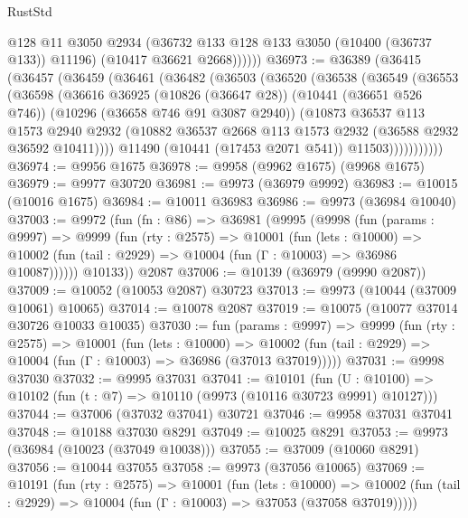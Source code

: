 \begin{lexlean}{RustStd}
\begin{coremodule}
              @128
              @11
              @3050
              @2934
              (@36732 @133 @128 @133 @3050 (@10400 (@36737 @133)) @11196)
              (@10417 @36621 @2668))))))
@36973 := @36389
    (@36415
      (@36457
        (@36459
          (@36461
            (@36482
              (@36503
                (@36520
                  (@36538
                    (@36549
                      (@36553
                        (@36598
                          (@36616
                            @36925
                            (@10826 (@36647 @28))
                            (@10441 (@36651 @526 @746))
                            (@10296 (@36658 @746 @91 @3087 @2940))
                            (@10873
                              @36537
                              @113
                              @1573
                              @2940
                              @2932
                              (@10882 @36537 @2668 @113 @1573 @2932 (@36588 @2932 @36592 @10411))))
                          @11490
                          (@10441 (@17453 @2071 @541))
                          @11503)))))))))))
@36974 := @9956 @1675
@36978 := @9958 (@9962 @1675) (@9968 @1675)
@36979 := @9977 @30720
@36981 := @9973 (@36979 @9992)
@36983 := @10015 (@10016 @1675)
@36984 := @10011 @36983
@36986 := @9973 (@36984 @10040)
@37003 := @9972
    (fun (fn : @86) =>
    @36981
      (@9995
        (@9998
          (fun (params : @9997) =>
          @9999
            (fun (rty : @2575) =>
            @10001
              (fun (lets : @10000) =>
              @10002 (fun (tail : @2929) => @10004 (fun (Γ : @10003) => @36986 @10087))))))
        @10133))
    @2087
@37006 := @10139 (@36979 (@9990 @2087))
@37009 := @10052 (@10053 @2087) @30723
@37013 := @9973 (@10044 (@37009 @10061) @10065)
@37014 := @10078 @2087
@37019 := @10075 (@10077 @37014 @30726 @10033 @10035)
@37030 := fun (params : @9997) =>
  @9999
    (fun (rty : @2575) =>
    @10001
      (fun (lets : @10000) =>
      @10002 (fun (tail : @2929) => @10004 (fun (Γ : @10003) => @36986 (@37013 @37019)))))
@37031 := @9998 @37030
@37032 := @9995 @37031
@37041 := @10101
    (fun (U : @10100) => @10102 (fun (t : @7) => @10110 (@9973 (@10116 @30723 @9991) @10127)))
@37044 := @37006 (@37032 @37041) @30721
@37046 := @9958 @37031 @37041
@37048 := @10188 @37030 @8291
@37049 := @10025 @8291
@37053 := @9973 (@36984 (@10023 (@37049 @10038)))
@37055 := @37009 (@10060 @8291)
@37056 := @10044 @37055
@37058 := @9973 (@37056 @10065)
@37069 := @10191
    (fun (rty : @2575) =>
    @10001
      (fun (lets : @10000) =>
      @10002 (fun (tail : @2929) => @10004 (fun (Γ : @10003) => @37053 (@37058 @37019)))))

\end{coremodule}
\end{lexlean}
